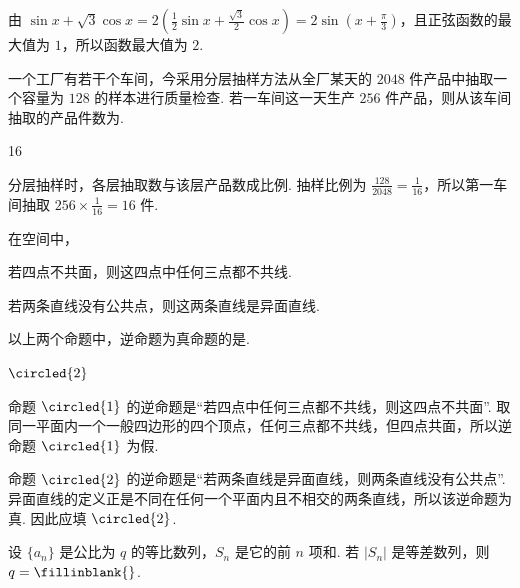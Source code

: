 \begin{solution}
由 \(\sin x+\sqrt3\cos x=2\left(\frac12\sin x+\frac{\sqrt3}{2}\cos x\right)=2\sin\left(x+\frac\pi3\right)\)，且正弦函数的最大值为 \(1\)，所以函数最大值为 \(2\).
\end{solution}

\begin{problem}
一个工厂有若干个车间，今采用分层抽样方法从全厂某天的 \(2048\) 件产品中抽取一个容量为 \(128\) 的样本进行质量检查. 若一车间这一天生产 \(256\) 件产品，则从该车间抽取的产品件数为\fillinblank{}.
\end{problem}

\begin{answer}
16
\end{answer}

\begin{solution}
分层抽样时，各层抽取数与该层产品数成比例. 抽样比例为
\(\frac{128}{2048}=\frac1{16}\)，所以第一车间抽取
\(256\times\frac1{16}=16\) 件.
\end{solution}

\begin{problem}
在空间中，
\begin{circlelist}
\item 若四点不共面，则这四点中任何三点都不共线.
\item 若两条直线没有公共点，则这两条直线是异面直线.
\end{circlelist}

以上两个命题中，逆命题为真命题的是\fillinblank{}.
\end{problem}

\begin{answer}
\(\circled{2}\)
\end{answer}

\begin{solution}
命题 \(\circled{1}\) 的逆命题是“若四点中任何三点都不共线，则这四点不共面”. 取同一平面内一个一般四边形的四个顶点，任何三点都不共线，但四点共面，所以逆命题 \(\circled{1}\) 为假.

命题 \(\circled{2}\) 的逆命题是“若两条直线是异面直线，则两条直线没有公共点”. 异面直线的定义正是不同在任何一个平面内且不相交的两条直线，所以该逆命题为真. 因此应填 \(\circled{2}\).
\end{solution}

\begin{problem}
设 \(\{a_n\}\) 是公比为 \(q\) 的等比数列，\(S_n\) 是它的前 \(n\) 项和. 若 \(|S_n|\) 是等差数列，则 \(q =\fillinblank{}\).
\end{problem}

